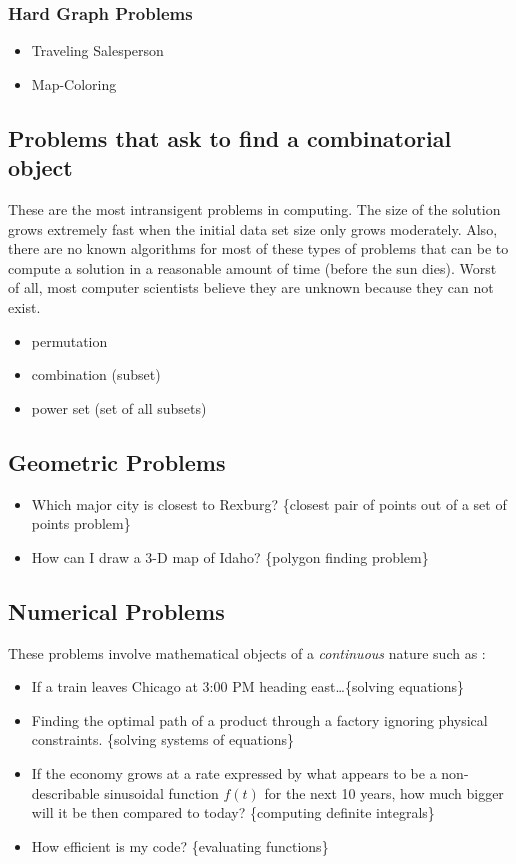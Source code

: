 \documentclass[12pt]{amsart}
\begin{document}
\subsubsection{Hard Graph Problems}
\begin{itemize}
	\item Traveling Salesperson
	\item Map-Coloring
\end{itemize}
\subsection{Problems that ask to find a combinatorial object} These are the most intransigent problems in computing. The size of the solution grows extremely fast when the initial data set size only grows moderately. Also, there are no known algorithms for most of these types of problems that can be to compute a solution in a reasonable amount of time (before the sun dies). Worst of all, most computer scientists believe they are unknown because they  can not exist.
\begin{itemize}
	\item permutation
    	\item combination (subset)
    	\item power set (set of all subsets)
\end{itemize}
\subsection{Geometric Problems}
\begin{itemize}
	\item Which major city is closest to Rexburg? \{closest pair of points out of a set of points problem\}
	\item How can I draw a 3-D map of Idaho? \{polygon finding problem\}
\end{itemize}

\subsection{Numerical Problems}

These problems involve mathematical objects of a \textit{continuous} nature such as :
\begin{itemize}
     	\item If a train leaves Chicago at 3:00 PM heading east\ldots \{solving equations\}
     	\item Finding the optimal path of a product through a factory ignoring physical constraints. \{solving systems of equations\}
     	\item If the economy grows at a rate expressed by what appears to be a non-describable sinusoidal function $f(t)$ for the next 10 years, how much bigger will it be then compared to today? \{computing definite integrals\}
     	\item How efficient is my code? \{evaluating functions\}
\end{itemize}
\end{document}
